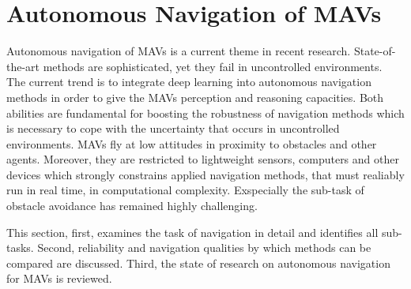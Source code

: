 \section{Autonomous Navigation of MAVs}          \label{sec:autonomous_navigation_of_MAVs}

Autonomous navigation of MAVs is a current theme in recent research.
State-of-the-art methods are sophisticated, yet they fail in uncontrolled environments.
The current trend is to integrate deep learning into autonomous navigation methods
in order to give the MAVs perception and reasoning capacities.
Both abilities are fundamental for boosting the robustness of navigation methods 
which is necessary to cope with the uncertainty that occurs in uncontrolled environments.
MAVs fly at low attitudes in proximity to obstacles and other agents.
Moreover, they are restricted to lightweight sensors, computers and other devices
which strongly constrains applied navigation methods, that must realiably run in real time, in computational complexity.
Exspecially the sub-task of obstacle avoidance has remained highly challenging. \cite{Ross2013}

This section, first, examines the task of navigation in detail and identifies all sub-tasks.
Second, reliability and navigation qualities by which methods can be compared are discussed.
Third, the state of research on autonomous navigation for MAVs is reviewed.



%
%
%
%
%
%

